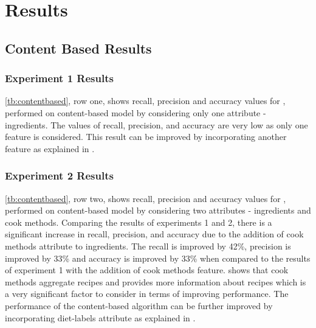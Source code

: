 \chapter{Results}
\label{ch:results}
\section{Content Based Results}
\subsection{Experiment 1 Results}
\label{sec:res1}
\autoref{tb:contentbased}, row one, shows recall, precision and accuracy values for , performed on content-based model by considering only one attribute - ingredients. The values of recall, precision, and accuracy are very low as only one feature is considered. This result can be improved by incorporating another feature as explained in .

\subsection{Experiment 2 Results}
\label{sec:res2}
\autoref{tb:contentbased}, row two, shows recall, precision and accuracy values for , performed on content-based model by considering two attributes - ingredients and cook methods. Comparing the results of experiments 1 and 2, there is a significant increase in recall, precision, and accuracy due to the addition of cook methods attribute to ingredients. The recall is improved by 42\%, precision is improved by 33\% and accuracy is improved by 33\% when compared to the results of experiment 1 with the addition of cook methods feature.  shows that cook methods aggregate recipes and provides more information about recipes which is a very significant factor to consider in terms of improving performance. The performance of the content-based algorithm can be further improved by incorporating diet-labels attribute as explained in .

